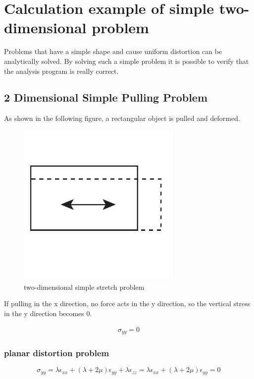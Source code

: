 \section{Calculation example of simple two-dimensional problem}


Problems that have a simple shape and cause uniform distortion can be analytically solved. By solving such a simple problem it is possible to verify that the analysis program is really correct.



\subsection{2 Dimensional Simple Pulling Problem}


As shown in the following figure, a rectangular object is pulled and deformed.



\begin{figure}
\center
\includegraphics[width=80mm]{images/uniform_strain.pdf}
\caption{two-dimensional simple stretch problem}
\end{figure}


If pulling in the x direction, no force acts in the y direction, so the vertical stress in the y direction becomes 0.

\begin{eqnarray}
\sigma_{yy}=0
\end{eqnarray}



\subsubsection{planar distortion problem}

\begin{equation}
\sigma_{yy}=\lambda\epsilon_{xx}+(\lambda+2\mu)\epsilon_{yy}+\lambda\epsilon_{zz}=\lambda\epsilon_{xx}+(\lambda+2\mu)\epsilon_{yy}=0
\end{equation}


